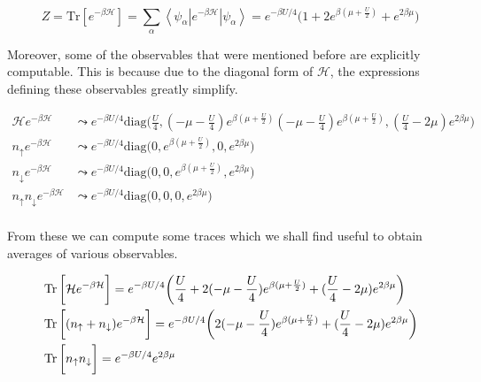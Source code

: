\begin{equation}\label{eq:singleSitePartition}
Z = \text{Tr} [ e^{-\beta\mathcal{H} } ] = \sum_\alpha \left\langle \psi_\alpha \left|e^{-\beta \mathcal{H} } \right| \psi_\alpha \right\rangle = e^{-\beta U / 4} \bigg(1 + 2 e^{\beta(\mu + \frac{U}{2})} + e^{2 \beta \mu} \bigg)
\end{equation}

Moreover, some of the observables that were mentioned before are explicitly computable.
This is because due to the diagonal form of $\mathcal{H}$, the expressions defining these observables greatly simplify.

\begin{equation}
\begin{split}
\mathcal{H} e^{-\beta\mathcal{H} } &\leadsto e^{-\beta U / 4}  \text{diag}\bigg(\frac{U}{4}, (-\mu - \frac{U}{4})  e^{\beta(\mu + \frac{U}{2})} (-\mu - \frac{U}{4}) e^{\beta(\mu + \frac{U}{2})}, (\frac{U}{4} - 2\mu ) e^{2\beta \mu} \bigg) \\
n_{\uparrow} e^{-\beta\mathcal{H} } &\leadsto e^{-\beta U / 4}  \text{diag}\bigg(0, e^{\beta(\mu + \frac{U}{2})}, 0,  e^{2\beta \mu} \bigg) \\
n_{\downarrow} e^{-\beta\mathcal{H} } &\leadsto e^{-\beta U / 4}  \text{diag}\bigg(0, 0, e^{\beta(\mu + \frac{U}{2})},   e^{2\beta \mu} \bigg) \\
n_{\uparrow} n_{\downarrow} e^{-\beta\mathcal{H} } &\leadsto e^{-\beta U / 4}  \text{diag}\bigg(0, 0, 0,   e^{2\beta \mu} \bigg) \\
\end{split}
\end{equation}

From these we can compute some traces which we shall find useful to obtain averages of various observables.

\begin{equation}
\begin{split}
&\operatorname{Tr} \bigg[ \mathcal{H} e^{-\beta\mathcal{H} } \bigg] = e^{-\beta U / 4} \bigg(\frac{U}{4} + 2 (-\mu - \frac{U}{4})  e^{\beta(\mu + \frac{U}{2})} + (\frac{U}{4} - 2\mu ) e^{2\beta \mu} \bigg) \\
&\operatorname{Tr} \bigg[ (n_\uparrow + n_\downarrow ) e^{-\beta\mathcal{H} } \bigg] = e^{-\beta U / 4} \bigg(2 (-\mu - \frac{U}{4})  e^{\beta(\mu + \frac{U}{2})} + (\frac{U}{4} - 2\mu ) e^{2\beta \mu} \bigg) \\
&\operatorname{Tr} \bigg[ n_\uparrow n_\downarrow \bigg] = e^{-\beta U/4} e^{2\beta\mu}
\end{split}
\end{equation}


